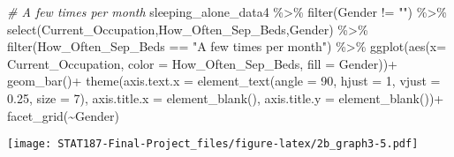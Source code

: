 \documentclass[
]{article}
\newenvironment{Shaded}{\begin{snugshade}}{\end{snugshade}}
\newcommand{\AttributeTok}[1]{\textcolor[rgb]{0.77,0.63,0.00}{#1}}
\newcommand{\CommentTok}[1]{\textcolor[rgb]{0.56,0.35,0.01}{\textit{#1}}}
\newcommand{\DecValTok}[1]{\textcolor[rgb]{0.00,0.00,0.81}{#1}}
\newcommand{\FloatTok}[1]{\textcolor[rgb]{0.00,0.00,0.81}{#1}}
\newcommand{\FunctionTok}[1]{\textcolor[rgb]{0.00,0.00,0.00}{#1}}
\newcommand{\NormalTok}[1]{#1}
\newcommand{\SpecialCharTok}[1]{\textcolor[rgb]{0.00,0.00,0.00}{#1}}
\newcommand{\StringTok}[1]{\textcolor[rgb]{0.31,0.60,0.02}{#1}}
\begin{document}
\begin{Shaded}
\begin{Highlighting}[]
\CommentTok{\# A few times per month }
\NormalTok{sleeping\_alone\_data4 }\SpecialCharTok{\%\textgreater{}\%} \FunctionTok{filter}\NormalTok{(Gender }\SpecialCharTok{!=} \StringTok{""}\NormalTok{) }\SpecialCharTok{\%\textgreater{}\%}
  \FunctionTok{select}\NormalTok{(Current\_Occupation,How\_Often\_Sep\_Beds,Gender) }\SpecialCharTok{\%\textgreater{}\%}
  \FunctionTok{filter}\NormalTok{(How\_Often\_Sep\_Beds }\SpecialCharTok{==} \StringTok{"A few times per month"}\NormalTok{) }\SpecialCharTok{\%\textgreater{}\%}
  \FunctionTok{ggplot}\NormalTok{(}\FunctionTok{aes}\NormalTok{(}\AttributeTok{x=}\NormalTok{ Current\_Occupation,}
             \AttributeTok{color =}\NormalTok{ How\_Often\_Sep\_Beds,}
             \AttributeTok{fill =}\NormalTok{ Gender))}\SpecialCharTok{+}
  \FunctionTok{geom\_bar}\NormalTok{()}\SpecialCharTok{+}
  \FunctionTok{theme}\NormalTok{(}\AttributeTok{axis.text.x =} \FunctionTok{element\_text}\NormalTok{(}\AttributeTok{angle =} \DecValTok{90}\NormalTok{,}
                                   \AttributeTok{hjust =} \DecValTok{1}\NormalTok{,}
                                   \AttributeTok{vjust =} \FloatTok{0.25}\NormalTok{,}
                                   \AttributeTok{size =} \DecValTok{7}\NormalTok{),}
        \AttributeTok{axis.title.x =} \FunctionTok{element\_blank}\NormalTok{(),}
        \AttributeTok{axis.title.y =} \FunctionTok{element\_blank}\NormalTok{())}\SpecialCharTok{+}
  \FunctionTok{facet\_grid}\NormalTok{(}\SpecialCharTok{\textasciitilde{}}\NormalTok{Gender)}
\end{Highlighting}
\end{Shaded}

\texttt{[image: STAT187-Final-Project\_files/figure-latex/2b\_graph3-5.pdf]}
\end{document}
